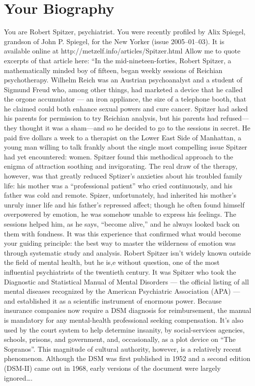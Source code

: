 \section{Your Biography}
\label{yourbiography}

You are Robert Spitzer, psychiatrist. You were recently profiled by Alix Spiegel, grandson of John P. Spiegel, for the New Yorker (issue 2005--01--03). It is available online at http:\slash \slash metzelf.info\slash articles\slash Spitzer.html
 Allow me to quote excerpts of that article here:
“In the mid-nineteen-forties, Robert Spitzer, a mathematically minded boy of fifteen, began weekly sessions of Reichian psychotherapy. Wilhelm Reich was an Austrian psychoanalyst and a student of Sigmund Freud who, among other things, had marketed a device that he called the orgone accumulator — an iron appliance, the size of a telephone booth, that he claimed could both enhance sexual powers and cure cancer. Spitzer had asked his parents for permission to try Reichian analysis, but his parents had refused—they thought it was a sham—and so he decided to go to the sessions in secret. He paid five dollars a week to a therapist on the Lower East Side of Manhattan, a young man willing to talk frankly about the single most compelling issue Spitzer had yet encountered: women. Spitzer found this methodical approach to the enigma of attraction soothing and invigorating. The real draw of the therapy, however, was that greatly reduced Sptizer's anxieties about his troubled family life: his mother was a “professional patient” who cried continuously, and his father was cold and remote. Spizer, unfortunately, had inherited his mother's unruly inner life and his father's repressed affect; though he often found himself overpowered by emotion, he was somehow unable to express his feelings. The sessions helped him, as he says, “become alive,” and he always looked back on them with fondness. It was this experience that confirmed what would become your guiding principle: the best way to master the wilderness of emotion was through systematic study and analysis.
Robert Spitzer isn't widely known outside the field of mental health, but he is,e without question, one of the most influential psychiatrists of the twentieth century. It was Spitzer who took the Diagnostic and Statistical Manual of Mental Disorders — the official listing of all mental diseases recognized by the American Psychiatric Association (APA) — and established it as a scientific instrument of enormous power. Because insurance companies now require a DSM diagnosis for reimbursement, the manual is mandatory for any mental-health professional seeking compensation. It’s also used by the court system to help determine insanity, by social-services agencies, schools, prisons, and government, and, occasionally, as a plot device on “The Sopranos”. This magnitude of cultural authority, however, is a relatively recent phenomenon. Although the DSM was first published in 1952 and a second edition (DSM-II) came out in 1968, early versions of the document were largely ignored{\ldots}.
